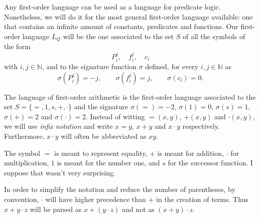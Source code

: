 \begin{example}
\label{lfo}
\begin{parlist}
\item \label{lq} Any first-order language can be used as a language for predicate logic. Nonetheless, we will do it for the most general first-order language available: one that contains an infinite amount of constants, predicates and functions. Our first-order language $L_Q$ will be the one associated to the set $S$ of all the symbols of the form
\[P_i^j,\quad f_i^j,\quad c_i\]
with $i,j\in\mathbb{N}$, and to the signature function $\sigma$ defined, for every $i,j\in\mathbb{N}$ as
\[\sigma\left(P_i^j\right) = -j,\qquad\sigma\left(f_i^j\right) = j,\qquad\sigma\left(c_i\right) = 0.\]

\item \label{lpa} The language of first-order arithmetic is the first-order language associated to the set $S = \{=,1,s,+,\cdot\}$ and the signature $\sigma(=)=-2$, $\sigma(1) = 0$, $\sigma(s) = 1$, $\sigma(+) = 2$ and $\sigma(\cdot) = 2$. Instead of witting $=\!(x,y)$, $+(x,y)$ and $\cdot(x,y)$, we will use \emph{infix notation} and write $x=y$, $x+y$ and $x\cdot y$ respectively.
Furthermore, $x\cdot y$ will often be abbreviated as $xy$.

The symbol $=$ is meant to represent equality, $+$ is meant for addition, $\cdot$ for multiplication, $1$ is meant for the number one, and $s$ for the successor function.
I suppose that wasn't very surprising.

In order to simplify the notation and reduce the number of parentheses, by convention, $\cdot$ will have higher precedence than $+$ in the creation of terms. Thus $x + y \cdot  z$ will be parsed as $x + ( y \cdot z) $ and not as $(x + y ) \cdot z$.
\end{parlist}
\end{example}

